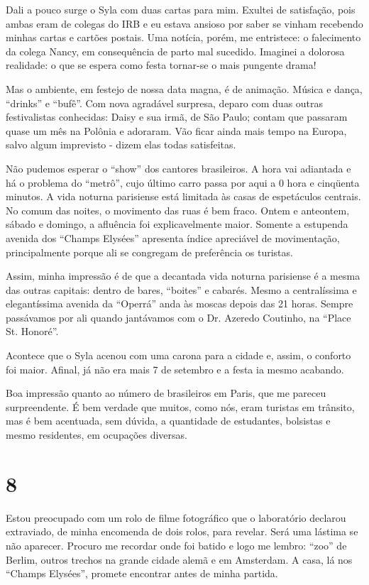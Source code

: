Dali a pouco surge o Syla com duas cartas para mim. Exultei de satisfação, pois ambas eram de colegas do IRB e eu estava ansioso por saber se vinham recebendo minhas cartas e cartões postais. Uma notícia, porém, me entristece: o falecimento da colega Nancy, em consequência de parto mal sucedido. Imaginei a dolorosa realidade: o que se espera como festa tornar-se o mais pungente drama!

Mas o ambiente, em festejo de nossa data magna, é de animação. Música e dança, “drinks” e “bufê”. Com nova agradável surpresa, deparo com duas outras festivalistas conhecidas: Daisy e sua irmã, de São Paulo; contam que passaram quase um mês na Polônia e adoraram. Vão ficar ainda mais tempo na Europa, salvo algum imprevisto - dizem elas todas satisfeitas.

Não pudemos esperar o “show” dos cantores brasileiros. A hora vai adiantada e há o problema do “metrô”, cujo último carro passa por aqui a 0 hora e cinqüenta minutos. A vida noturna parisiense está limitada às casas de espetáculos centrais. No comum das noites, o movimento das ruas é bem fraco. Ontem e anteontem, sábado e domingo, a afluência foi explicavelmente maior. Somente a estupenda avenida dos “Champs Elysées” apresenta índice apreciável de movimentação, principalmente porque ali se congregam de preferência os turistas.

Assim, minha impressão é de que a decantada vida noturna parisiense é a mesma das outras capitais: dentro de bares, “boites” e cabarés. Mesmo a centralíssima e elegantíssima avenida da “Operrá” anda às moscas depois das 21 horas. Sempre passávamos por ali quando jantávamos com o Dr. Azeredo Coutinho, na “Place St. Honoré”.

Acontece que o Syla acenou com uma carona para a cidade e, assim, o conforto foi maior. Afinal, já não era mais 7 de setembro e a festa ia mesmo acabando.

Boa impressão quanto ao número de brasileiros em Paris, que me pareceu surpreendente. É bem verdade que muitos, como nós, eram turistas em trânsito, mas é bem acentuada, sem dúvida, a quantidade de estudantes, bolsistas e mesmo residentes, em ocupações diversas.

\section*{8 \adfflatleafright {}}
Estou preocupado com um rolo de filme fotográfico que o laboratório declarou extraviado, de minha encomenda de dois rolos, para revelar. Será uma lástima se não aparecer. Procuro me recordar onde foi batido e logo me lembro: “zoo” de Berlim, outros trechos na grande cidade alemã e em Amsterdam. A casa, lá nos “Champs Elysées”, promete encontrar antes de minha partida.

